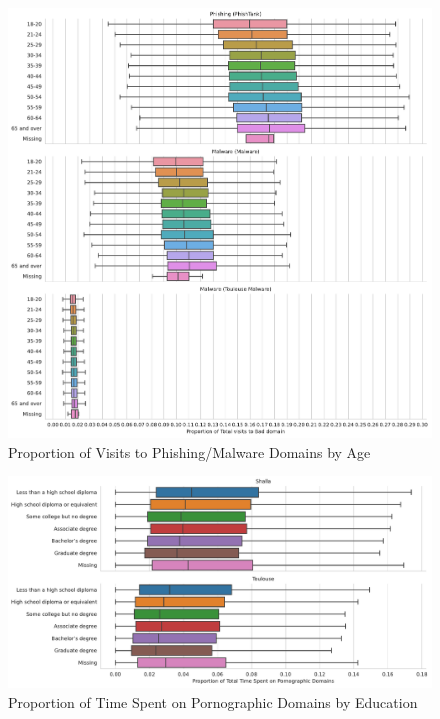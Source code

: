 \documentclass[12pt, letterpaper]{article}
\begin{document}
\begin{figure}[!htb]
	 \centering
	 \caption{Proportion of Visits to Phishing/Malware Domains by Age}
	 \label{fig:prop_total_visits_phishing_malware_age}
	 \includegraphics[width=\textwidth]{../figs/prop_total_visits_phishing_malware_tl_age.pdf}
\end{figure}


\begin{figure}[!htb]
  \centering
  \caption{Proportion of Time Spent on Pornographic Domains by Education}
	\label{fig:prop_time_porn_educ}
	\includegraphics[width=\textwidth]{../figs/prop_total_time_porn_educ.pdf}
\end{figure}
\end{document}
